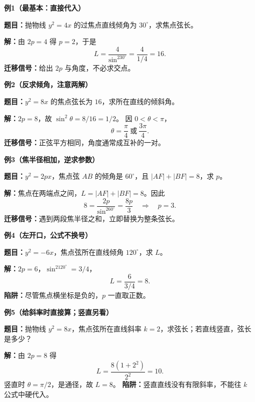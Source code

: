 \clearpage
\begin{examplebox}
\textbf{\textcolor{CExample}{例1（最基本：直接代入）}}\par
\textbf{题目：}抛物线 $y^2=4x$ 的过焦点直线倾角为 $30^\circ$，求焦点弦长。\par
\textbf{解：}由 $2p=4$ 得 $p=2$，于是
\[
\boxed{L=\frac{4}{\sin^230^\circ}=\frac4{1/4}=16.}
\]
\textbf{迁移信号：}给出 $2p$ 与角度，不必求交点。\par\medskip
\textbf{\textcolor{CExample}{例2（反求倾角，注意两解）}}\par
\textbf{题目：}$y^2=8x$ 的焦点弦长为 $16$，求所在直线的倾斜角。\par
\textbf{解：}$2p=8$，故 $\sin^2\theta=8/16=1/2$。
因 $0<\theta<\pi$，
\[
\boxed{\theta=\frac\pi4\ \text{或}\ \frac{3\pi}4.}
\]
\textbf{迁移信号：}正弦平方相同，角度通常成互补的一对。\par\medskip
\textbf{\textcolor{CExample}{例3（焦半径相加，逆求参数）}}\par
\textbf{题目：}$y^2=2px$，焦点弦 $AB$ 的倾角是 $60^\circ$，且
$|AF|+|BF|=8$，求 $p$。\par
\textbf{解：}焦点在两端点之间，$L=|AF|+|BF|=8$。因此
\[
8=\frac{2p}{\sin^260^\circ}=\frac{8p}{3}
\quad\Longrightarrow\quad\boxed{p=3}.
\]
\textbf{迁移信号：}遇到两段焦半径之和，立即替换为整条弦长。\par\medskip
\end{examplebox}
\clearpage
\begin{examplebox}
\textbf{\textcolor{CExample}{例4（左开口，公式不换号）}}\par
\textbf{题目：}$y^2=-6x$，焦点弦所在直线倾角 $120^\circ$，求 $L$。\par
\textbf{解：}$2p=6$，$\sin^2120^\circ=3/4$，
\[\boxed{L=\frac6{3/4}=8}.\]
\textbf{陷阱：}尽管焦点横坐标是负的，$p$ 一直取正数。\par\medskip
\textbf{\textcolor{CExample}{例5（给斜率时直接算；竖直另看）}}\par
\textbf{题目：}抛物线 $y^2=8x$，焦点弦所在直线斜率 $k=2$，求弦长；若直线竖直，弦长是多少？\par
\textbf{解：}由 $2p=8$ 得
\[
\boxed{L=\frac{8(1+2^2)}{2^2}=10}.
\]
竖直时 $\theta=\pi/2$，是通径，故 $\boxed{L=8}$。
\textbf{陷阱：}竖直直线没有有限斜率，不能往 $k$ 公式中硬代入。\par\medskip
\end{examplebox}
\clearpage
